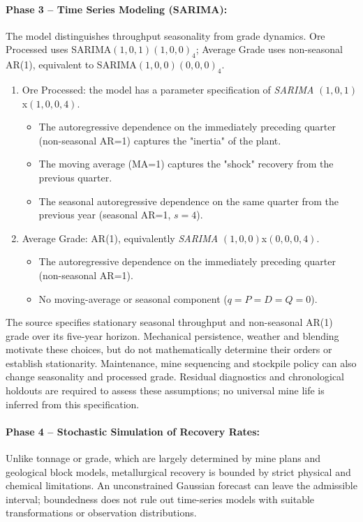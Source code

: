 \paragraph{Phase 3 -- Time Series Modeling (SARIMA):}
The model distinguishes throughput seasonality from grade dynamics. Ore
Processed uses SARIMA$(1,0,1)(1,0,0)_4$; Average Grade uses non-seasonal
AR(1), equivalent to SARIMA$(1,0,0)(0,0,0)_4$.

\begin{enumerate}
\item Ore Processed: the model has a parameter specification of \textit{SARIMA} $(1,0,1)$x$(1,0,0,4)$. 
    \begin{itemize}
        \item The autoregressive dependence on the immediately preceding quarter (non-seasonal AR=1) captures the "inertia" of the plant.
        \item The moving average (MA=1) captures the "shock" recovery from the previous quarter.
        \item The seasonal autoregressive dependence on the same quarter from the previous year (seasonal AR=1, $s=4$).
    \end{itemize}

\item Average Grade: AR(1), equivalently \textit{SARIMA} $(1,0,0)$x$(0,0,0,4)$.
    \begin{itemize}
        \item The autoregressive dependence on the immediately preceding quarter (non-seasonal AR=1).
        \item No moving-average or seasonal component ($q=P=D=Q=0$).
    \end{itemize}
\end{enumerate}

The source specifies stationary seasonal throughput and non-seasonal AR(1) grade over its five-year horizon. Mechanical persistence, weather and blending motivate these choices, but do not mathematically determine their orders or establish stationarity. Maintenance, mine sequencing and stockpile policy can also change seasonality and processed grade. Residual diagnostics and chronological holdouts are required to assess these assumptions; no universal mine life is inferred from this specification.

\paragraph{Phase 4 -- Stochastic Simulation of Recovery Rates:}
Unlike tonnage or grade, which are largely determined by mine plans and geological block models, metallurgical recovery is bounded by strict physical and chemical limitations. An unconstrained Gaussian forecast can leave the admissible interval; boundedness does not rule out time-series models with suitable transformations or observation distributions.

